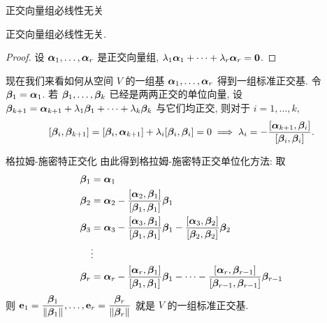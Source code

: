 \begin{frame}{正交向量组必线性无关}
	\onslide<+->
	\begin{theorem}
		正交向量组必线性无关.
	\end{theorem}
	\onslide<+->
	\begin{proof}
		设 $\bma_1,\dots,\bma_r$ 是正交向量组,
		$\lambda_1\bma_1+\cdots+\lambda_r\bma_r={\bf0}$.
		\onslide<+->{%
			故 $\bma_1,\dots,\bma_r$ 线性无关.\qedhere
		}
	\end{proof}
	
	\onslide<+->
	现在我们来看如何从空间 $V$ 的一组基 $\bma_1,\dots,\bma_r$ 得到一组标准正交基.
	\onslide<+->
	令 $\bmb_1=\bma_1$.
	\onslide<+->
	若 $\bmb_1,\dots,\bmb_k$ 已经是两两正交的单位向量, 设 $\bmb_{k+1}=\bma_{k+1}+\lambda_1\bmb_1+\dots+\lambda_k\bmb_k$ 与它们均正交, 
	\onslide<+->
	则对于 $i=1,\dots,k$,
	\[[\bmb_i,\bmb_{k+1}]=[\bmb_i,\bma_{k+1}]+\lambda_i[\bmb_i,\bmb_i]=0\implies\lambda_i=-\frac{[\bma_{k+1},\bmb_i]}{[\bmb_i,\bmb_i]}.\]
\end{frame}


\begin{frame}{格拉姆-施密特正交化}
	\onslide<+->
	由此得到\alert{格拉姆-施密特正交单位化方法}: 取
		\begin{align*}
			\bmb_1&=\bma_1\\
			\bmb_2&=\bma_2-\frac{[\bma_2,\bmb_1]}{[\bmb_1,\bmb_1]}\bmb_1\\
			\bmb_3&=\bma_3-\frac{[\bma_3,\bmb_1]}{[\bmb_1,\bmb_1]}\bmb_1-\frac{[\bma_3,\bmb_2]}{[\bmb_2,\bmb_2]}\bmb_2\\
			&\vdots\\
			\bmb_r&=\bma_r-\frac{[\bma_r,\bmb_1]}{[\bmb_1,\bmb_1]}\bmb_1-\cdots-\frac{[\bma_r,\bmb_{r-1}]}{[\bmb_{r-1},\bmb_{r-1}]}\bmb_{r-1}
		\end{align*}
	\onslide<+->
	则 $\bfe_1=\dfrac{\bmb_1}{\|\bmb_1\|},\dots,\bfe_r=\dfrac{\bmb_r}{\|\bmb_r\|}$ 就是 $V$ 的一组标准正交基.
\end{frame}


